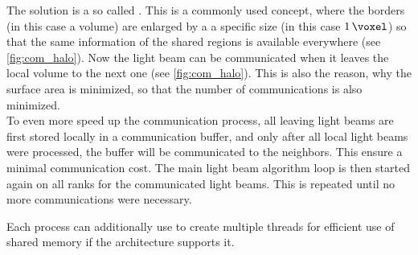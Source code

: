 The solution is a so called .
This is a commonly used concept, where the borders (in this case a volume) are enlarged by a a specific size (in this case $\SI{1}{\voxel}$) so that the same information of the shared regions is available everywhere (see \cref{fig:com_halo}).
%
Now the light beam can be communicated when it leaves the local volume to the next one (see \cref{fig:com_halo}).
This is also the reason, why the surface area is minimized, so that the number of communications is also minimized.
\\
To even more speed up the communication process, all leaving light beams are first stored locally in a communication buffer, and only after all local light beams were processed, the buffer will be communicated to the neighbors.
This ensure a minimal communication cost.
The main light beam algorithm loop is then started again on all \mpi{} ranks for the communicated light beams.
This is repeated until no more communications were necessary.
\par
%
Each \mpi{} process can additionally use \openmp{} to create multiple threads for efficient use of shared memory if the architecture supports it.
% 
%